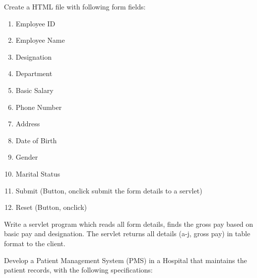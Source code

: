 \documentclass[12pt, a4]{article}
\begin{document}
\begin{flushleft}
Create a HTML file with following form fields:

\begin{enumerate}
\item Employee ID
\item Employee Name
\item Designation
\item Department
\item Basic Salary
\item Phone Number
\item Address
\item Date of Birth
\item Gender
\item Marital Status
\item Submit (Button, onclick submit the form details to a servlet)
\item Reset (Button, onclick)
\end{enumerate}

Write a servlet program which reads all form details, finds the gross pay based on basic pay and designation. The servlet returns all details (a-j, gross pay) in table format to the client.\newline 

Develop a Patient Management System (PMS) in a Hospital that maintains the
patient records, with the following specifications:


\end{flushleft}
\end{document}

